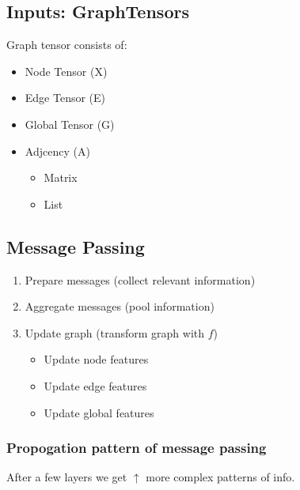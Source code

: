 \subsection{Inputs: GraphTensors}
\begin{notes}
    Graph tensor consists of:
    \begin{itemize}
        \item Node Tensor (X)
        \item Edge Tensor (E)
        \item Global Tensor (G)
        \item Adjcency (A)
        \begin{itemize}
            \item Matrix
            \item List
        \end{itemize}
    \end{itemize}
\end{notes}

\subsection{Message Passing}
\begin{algo}
    \begin{enumerate}
        \item Prepare messages (collect relevant information)
        \item Aggregate messages (pool information)
        \item Update graph (transform graph with \(f\))
        \begin{itemize}
            \item Update node features
            \item Update edge features
            \item Update global features
        \end{itemize}
    \end{enumerate}
\end{algo}
\newpage

\subsubsection{Propogation pattern of message passing}
\begin{notes}
    After a few layers we get $\uparrow$ more complex patterns of info. 
\end{notes}
\newpage

